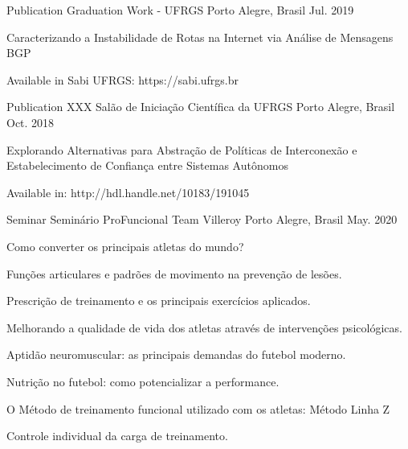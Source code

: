 

\begin{cventries}
  \cventry
    {Publication} %
    {Graduation Work - UFRGS} %
    {Porto Alegre, Brasil} %
    {Jul. 2019} %
     {
      \begin{cvitems} %
        \item {Caracterizando a Instabilidade de Rotas na Internet via Análise de Mensagens BGP}
        \item {Available in Sabi UFRGS: https://sabi.ufrgs.br}
      \end{cvitems}
     }

  \cventry
    {Publication} %
    {XXX Salão de Iniciação Científica da UFRGS} %
    {Porto Alegre, Brasil} %
    {Oct. 2018} %
     {
      \begin{cvitems} %
        \item {Explorando Alternativas para Abstração de Políticas de Interconexão e Estabelecimento de Confiança entre Sistemas Autônomos}
        \item {Available in: http://hdl.handle.net/10183/191045}
      \end{cvitems}
     }
     
  \cventry
    {Seminar} %
    {Seminário ProFuncional Team Villeroy} %
    {Porto Alegre, Brasil} %
    {May. 2020} %
    {
      \begin{cvitems} %
        \item {Como converter os principais atletas do mundo?}
        \item {Funções articulares e padrões de movimento na prevenção de lesões.}
        \item {Prescrição de treinamento e os principais exercícios aplicados.}
        \item {Melhorando a qualidade de vida dos atletas através de intervenções psicológicas.}
        \item {Aptidão neuromuscular: as principais demandas do futebol moderno.}
        \item {Nutrição no futebol: como potencializar a performance.}
        \item {O Método de treinamento funcional utilizado com os atletas: Método Linha Z}
        \item {Controle individual da carga de treinamento.}
      \end{cvitems}
    }
    

\end{cventries}
